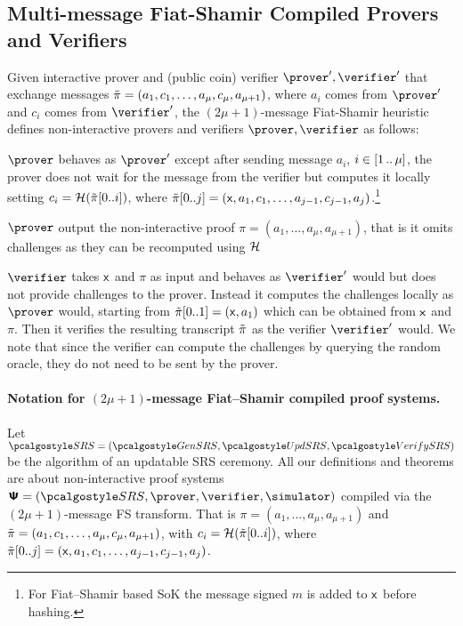 \subsection{Multi-message Fiat-Shamir Compiled Provers and Verifiers}
Given interactive prover and (public coin) verifier $\prover', \verifier'$ that exchange messages $\tilde{\pi} = (a_1, c_1, \ldots, a_{\mu}, c_{\mu}, a_{\mu + 1})$, where $a_i$ comes from
$\prover'$ and $c_i$ comes from $\verifier'$, the $(2\mu + 1)$-message Fiat-Shamir heuristic defines non-interactive provers and verifiers $\prover, \verifier$ as follows:

\begin{compactitem}
	\item $\prover$ behaves as $\prover'$ except after sending message
	  $a_i$, $i \in [1 \, .. \, \mu]$, the prover does not wait for
	  the message from the verifier but computes it locally setting $c_i
	  = \mathcal{H}(\tilde{\pi}[0..i])$, where $\tilde{\pi}[0..j] = (\mathsf{x}, a_1, c_1, \ldots,
	  a_{j - 1}, c_{j - 1}, a_j)$.\footnote{For Fiat--Shamir based SoK the message signed $m$ is added to $\mathsf{x}$ before hashing.} 
	  
	  $\prover$ output the non-interactive proof $\pi=(a_1,\ldots, a_{\mu}, a_{\mu + 1})$, that is it omits challenges as they can be recomputed using $\mathcal{H}$

	\item $\verifier$ takes $\mathsf{x}$ and $\pi$ as input and behaves as $\verifier'$ would but does not provide
	  challenges to the prover. Instead it computes the
	  challenges locally as $\prover$ would, starting from $\tilde{\pi}[0..1]=(\mathsf{x},a_1)$ which can be obtained from $\mathsf{x}$ and $\pi$. Then it verifies the
	  resulting transcript $\tilde{\pi}$ as the verifier $\verifier'$ would. We note that since the verifier can compute the challenges by querying the random oracle, they do not need to be sent by the prover.
	\end{compactitem}



\paragraph{Notation for $(2\mu + 1)$-message Fiat--Shamir compiled proof systems.}
Let $\SRScer= (\kgen,\upd, \verifyCRS)$ be the algorithm of an updatable SRS ceremony.
All our definitions and theorems are about non-interactive proof systems $\ps = (\SRScer, \prover, \verifier, \simulator)$ compiled via the $(2\mu + 1)$-message FS transform. 
%
That is $\pi = (a_1, \ldots, a_{\mu}, a_{\mu + 1})$ and $\tilde{\pi} = (a_1, c_1, \ldots, a_{\mu}, c_{\mu}, a_{\mu + 1})$, with $c_i
= \mathcal{H}(\tilde{\pi}[0..i])$, where $\tilde{\pi}[0..j] = (\mathsf{x}, a_1, c_1, \ldots,
a_{j - 1}, c_{j - 1}, a_j)$.

